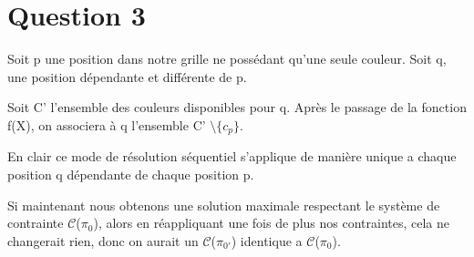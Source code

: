 
\section{Question 3}

Soit p une position dans notre grille ne poss\'edant qu'une seule couleur. Soit q, une position d\'ependante et diff\'erente de p. 

Soit C' l'ensemble des couleurs disponibles pour q. Apr\`es le passage de la fonction f(X), on associera \`a q l'ensemble C' $\setminus \lbrace c_p \rbrace$. 

\bigskip
En clair ce mode de r\'esolution s\'equentiel s'applique de mani\`ere unique a chaque position q d\'ependante de chaque position p.

Si maintenant nous obtenons une solution maximale respectant le syst\`eme de contrainte $\mathcal{C}$($\pi_0$), alors en r\'eappliquant une fois de plus nos contraintes, cela ne changerait rien, donc on aurait un $\mathcal{C}$($\pi_{0'}$) identique a $\mathcal{C}$($\pi_0$).